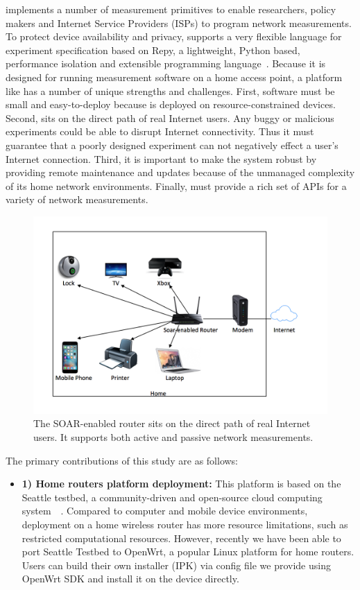 {\sysname
implements a number of measurement primitives to enable researchers,
policy makers and Internet Service Providers (ISPs) to program network measurements.
To protect device availability and privacy, \sysname supports a very flexible
  language for experiment specification based on Repy, a lightweight,
 Python based, performance isolation and extensible programming
  language~\cite{cappos2010retaining}. Because it is designed for running
  measurement software on a home access point, a platform
  like \sysname has a number of unique strengths and challenges.
First, software must be small and easy-to-deploy because \sysname is deployed
on resource-constrained devices. Second, \sysname sits on the direct path of real
  Internet users. Any buggy or malicious experiments could be able to disrupt
  Internet connectivity. Thus it must guarantee that a poorly designed experiment
  can not negatively effect a user's Internet connection. Third, it is important
to make the system robust by providing remote maintenance and updates because
    of the unmanaged complexity of its home network environments. Finally, \sysname
must provide a rich set of APIs for a variety of network measurements.


\begin{figure}%
\centering
\includegraphics[width=0.8\columnwidth]{figure/home-network.png}
\caption{The SOAR-enabled router sits on the direct path of real
Internet users. It supports both active and passive network measurements.}
\label{figure:design}
\end{figure}


The primary contributions of this study are as follows:
{\raggedright
\begin{itemize}
\item\textbf{1) Home routers platform deployment:} This platform is based on
the Seattle testbed, a community-driven and open-source cloud computing
system~\cite{zhuang2013experience}~\cite{cappos2009seattle}. Compared to computer
 and mobile device environments, deployment on a home wireless router has more
 resource limitations, such as restricted computational resources. However,
 recently we have been able to port Seattle Testbed to OpenWrt, a popular Linux
 platform for home routers\cite{openwrt}. Users can build their own \sysname
 installer (IPK) via config file we provide using OpenWrt SDK and install it on the device directly.


\end{itemize}}}
